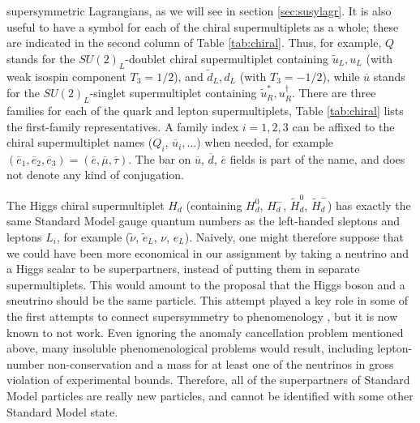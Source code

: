 \documentclass[12pt]{article}
\def\sbar{\overline}
\def\stilde{\widetilde}
\begin{document}
supersymmetric Lagrangians, as we will see in section \ref{sec:susylagr}.
It is also useful to have a symbol for each of the chiral supermultiplets
as a whole; these are indicated in the second column of 
Table \ref{tab:chiral}. Thus, for
example, $Q$ stands for the $SU(2)_L$-doublet chiral supermultiplet
containing $\stilde u_L,u_L$ (with weak isospin component $T_3=1/2$), and
$\stilde d_L, d_L$ (with $T_3=-1/2$), while $\sbar u$ stands for the
$SU(2)_L$-singlet supermultiplet containing $\stilde u_R^*, u_R^\dagger$.
There are three families for each of the quark and lepton supermultiplets,
Table \ref{tab:chiral} lists the first-family representatives. A family
index $i=1,2,3$ can be affixed to the chiral supermultiplet names ($Q_i$,
$\sbar u_i, \ldots$) when needed, for example 
$(\sbar e_1, \sbar e_2, \sbar e_3)=
(\sbar e, \sbar \mu, \sbar \tau)$. The bar on $\sbar u$, $\sbar d$, $\sbar
e$ fields is part of the name, and does not denote any kind of
conjugation. 

The Higgs chiral supermultiplet $H_d$
(containing $H_d^0$, $H_d^-$, $\stilde H_d^0$, $\stilde H_d^-$) has
exactly the same Standard Model gauge quantum numbers as the left-handed
sleptons and leptons $L_i$, for example ($\stilde \nu$, $\stilde e_L$, $\nu$,
$e_L$). Naively, one might therefore suppose that we could have been more
economical in our assignment by taking a neutrino and a Higgs scalar to be
superpartners, instead of putting them in separate supermultiplets. This
would amount to the proposal that the Higgs boson and a sneutrino should
be the same particle. This attempt played a key role in some of the first
attempts to connect supersymmetry to phenomenology \cite{FayetHsnu}, but
it is now known to not work. Even ignoring the anomaly cancellation
problem mentioned above, many insoluble phenomenological problems would
result, including lepton-number non-conservation and a mass for at least
one of the neutrinos in gross violation of experimental bounds. Therefore,
all of the superpartners of Standard Model particles are really new
particles, and cannot be identified with some other Standard Model state. 
\end{document}
